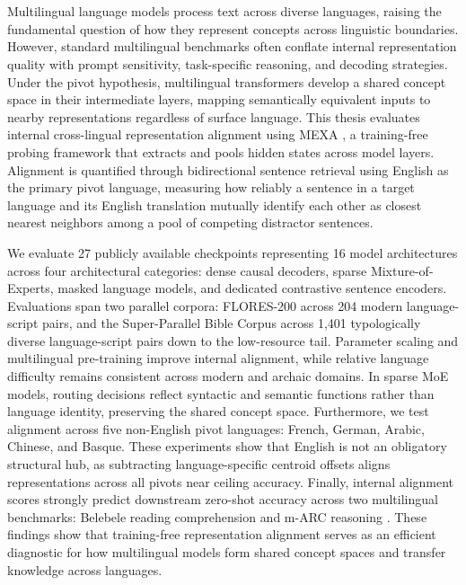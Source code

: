 \chapter{\abstractname}

Multilingual language models process text across diverse languages, raising the fundamental question of how they represent concepts across linguistic boundaries. However, standard multilingual benchmarks often conflate internal representation quality with prompt sensitivity, task-specific reasoning, and decoding strategies. Under the pivot hypothesis, multilingual transformers develop a shared concept space in their intermediate layers, mapping semantically equivalent inputs to nearby representations regardless of surface language. This thesis evaluates internal cross-lingual representation alignment using MEXA \citep{kargaran2025mexa}, a training-free probing framework that extracts and pools hidden states across model layers. Alignment is quantified through bidirectional sentence retrieval using English as the primary pivot language, measuring how reliably a sentence in a target language and its English translation mutually identify each other as closest nearest neighbors among a pool of competing distractor sentences.

We evaluate 27 publicly available checkpoints representing 16 model architectures across four architectural categories: dense causal decoders, sparse Mixture-of-Experts, masked language models, and dedicated contrastive sentence encoders. Evaluations span two parallel corpora: FLORES-200 \citep{nllbteam2022} across 204 modern language-script pairs, and the Super-Parallel Bible Corpus \citep{mayer2014bible, kargaran2025mexa} across 1,401 typologically diverse language-script pairs down to the low-resource tail. Parameter scaling and multilingual pre-training improve internal alignment, while relative language difficulty remains consistent across modern and archaic domains. In sparse MoE models, routing decisions reflect syntactic and semantic functions rather than language identity, preserving the shared concept space. Furthermore, we test alignment across five non-English pivot languages: French, German, Arabic, Chinese, and Basque. These experiments show that English is not an obligatory structural hub, as subtracting language-specific centroid offsets aligns representations across all pivots near ceiling accuracy. Finally, internal alignment scores strongly predict downstream zero-shot accuracy across two multilingual benchmarks: Belebele reading comprehension \citep{bandarkar2024belebele} and m-ARC reasoning \citep{lai2023okapi}. These findings show that training-free representation alignment serves as an efficient diagnostic for how multilingual models form shared concept spaces and transfer knowledge across languages.
